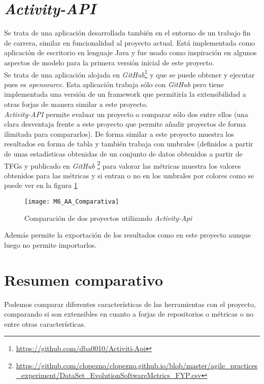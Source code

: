 \section{\textit{Activity-API}}
Se trata de una aplicación desarrollada también en el entorno de un trabajo fin de carrera, similar en funcionalidad al proyecto actual. Está implementada como aplicación de escritorio en lenguaje Java y fue usado como inspiración en algunos aspectos de modelo para la primera versión inicial\cite{TFGPrevio} de este proyecto. \\
Se trata de una aplicación alojada en \textit{GitHub}\footnote{\url{https://github.com/dba0010/Activiti-Api}} y que se puede obtener y ejecutar pues es \textit{opensource}. Esta aplicación trabaja sólo con \textit{GitHub} pero tiene implementada una versión de un framework que permitiría la extensibilidad a otras forjas de manera similar a este proyecto.\\
\textit{Activity-API} permite evaluar un proyecto o comparar sólo dos entre ellos (una clara desventaja frente a este proyecto que permite añadir proyectos de forma ilimitada para compararlos). De forma similar a este proyecto muestra los resultados en forma de tabla y también trabaja con umbrales (definidos a partir de unas estadísticas obtenidas de un conjunto de datos obtenidos a partir de TFGs y publicado en \textit{GitHub} \footnote{\url{https://github.com/clopezno/clopezno.github.io/blob/master/agile_practices_experiment/DataSet_EvolutionSoftwareMetrics_FYP.csv}}  para valorar las métricas muestra los valores obtenidos para las métricas y si entran o no en los umbrales por colores como se puede ver en la  figura \ref{fig:M6_AA_Comparativa}

\begin{figure}[!h]
	\centering
	\texttt{[image: M6\_AA\_Comparativa]}
	\caption{Comparación de dos proyectos utilizando \textit{Activity-Api}}\label{fig:M6_AA_Comparativa}
\end{figure}
\FloatBarrier

Además permite la exportación de los resultados como en este proyecto aunque luego no permite importarlos.


\section{Resumen comparativo}

Podemos comparar diferentes características de las herramientas con el proyecto, comparando si son extensibles en cuanto a forjas de repositorios o métricas o no entre otras características.\\

